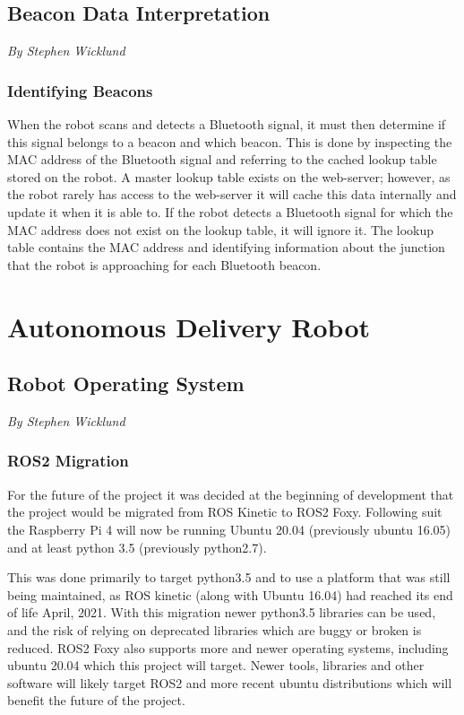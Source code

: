 \documentclass[12pt]{report}
\newcommand{\sectionAuthor}[1]{{\small\vspace{-1em}\textit{#1}}\bigskip\par}
\begin{document}
\subsection{Beacon Data Interpretation}
\sectionAuthor{By Stephen Wicklund}
\subsubsection{Identifying Beacons}
When the robot scans and detects a Bluetooth signal, it must then determine if this signal belongs to a beacon and which beacon. This is done by inspecting the MAC address of the Bluetooth signal and referring to the cached lookup table stored on the robot. A master lookup table exists on the web-server; however, as the robot rarely has access to the web-server it will cache this data internally and update it when it is able to. If the robot detects a Bluetooth signal for which the MAC address does not exist on the lookup table, it will ignore it. The lookup table contains the MAC address and identifying information about the junction that the robot is approaching for each Bluetooth beacon.

\section{Autonomous Delivery Robot}
\subsection{Robot Operating System}
\sectionAuthor{By Stephen Wicklund}
\subsubsection{ROS2 Migration}
For the future of the project it was decided at the beginning of development that the project would be migrated from ROS Kinetic to ROS2 Foxy. Following suit the Raspberry Pi 4 will now be running Ubuntu 20.04 (previously ubuntu 16.05) and at least python 3.5 (previously python2.7).

This was done primarily to target python3.5 and to use a platform that was still being maintained, as ROS kinetic (along with Ubuntu 16.04) had reached its end of life April, 2021. With this migration newer python3.5 libraries can be used, and the risk of relying on deprecated libraries which are buggy or broken is reduced. ROS2 Foxy also supports more and newer operating systems, including ubuntu 20.04 which this project will target. Newer tools, libraries and other software will likely target ROS2 and more recent ubuntu distributions which will benefit the future of the project.
\end{document}
